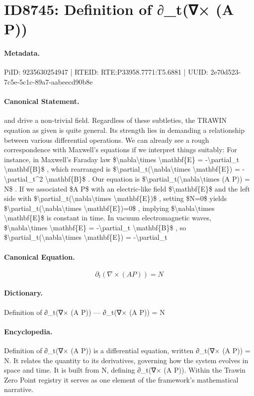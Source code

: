 \section*{ID8745: Definition of ∂\_t(∇× (A P))}
\paragraph{Metadata.}
PiID: 9235630254947 | RTEID: RTE:P33958.7771:T5.6881 | UUID: 2e70d523-7c5e-5c1c-89a7-aabeecd90b8e

\paragraph{Canonical Statement.}
and drive a non-trivial field. Regardless of these subtleties, the TRAWIN equation as given is quite general. Its strength lies in demanding a relationship between various differential operations. We can already see a rough correspondence with Maxwell’s equations if we interpret things suitably: For instance, in Maxwell’s Faraday law \$\textbackslash{}nabla\textbackslash{}times \textbackslash{}mathbf\{E\} = -\textbackslash{}partial\_t \textbackslash{}mathbf\{B\}\$ , which rearranged is \$\textbackslash{}partial\_t(\textbackslash{}nabla\textbackslash{}times \textbackslash{}mathbf\{E\}) = -\textbackslash{}partial\_t\textasciicircum{}2 \textbackslash{}mathbf\{B\}\$ . Our equation is \$\textbackslash{}partial\_t(\textbackslash{}nabla\textbackslash{}times (A P)) = N\$ . If we associated \$A P\$ with an electric-like field \$\textbackslash{}mathbf\{E\}\$ and the left side with \$\textbackslash{}partial\_t(\textbackslash{}nabla\textbackslash{}times \textbackslash{}mathbf\{E\})\$ , setting \$N=0\$ yields \$\textbackslash{}partial\_t(\textbackslash{}nabla\textbackslash{}times \textbackslash{}mathbf\{E\})=0\$ , implying \$\textbackslash{}nabla\textbackslash{}times \textbackslash{}mathbf\{E\}\$ is constant in time. In vacuum electromagnetic waves, \$\textbackslash{}nabla\textbackslash{}times \textbackslash{}mathbf\{E\} = -\textbackslash{}partial\_t \textbackslash{}mathbf\{B\}\$ , so \$\textbackslash{}partial\_t(\textbackslash{}nabla\textbackslash{}times \textbackslash{}mathbf\{E\}) = -\textbackslash{}partial\_t

\paragraph{Canonical Equation.}
\[
\partial_t(\nabla\times (A P)) = N
\]

\paragraph{Dictionary.}
Definition of ∂\_t(∇× (A P)) — ∂\_t(∇× (A P)) = N

\paragraph{Encyclopedia.}
Definition of ∂\_t(∇× (A P)) is a differential equation, written ∂\_t(∇× (A P)) = N. It relates the quantity to its derivatives, governing how the system evolves in space and time. It is built from N, defining ∂\_t(∇× (A P)). Within the Trawin Zero Point registry it serves as one element of the framework's mathematical narrative.
